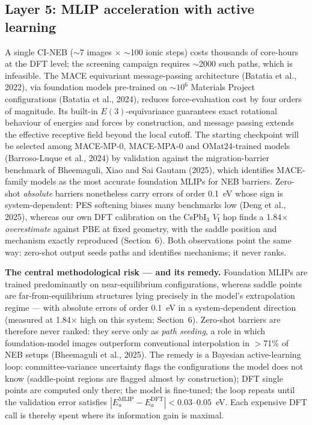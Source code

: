 \documentclass[11pt,a4paper]{article}
\begin{document}
\subsection{Layer 5: MLIP acceleration with active learning}
A single CI-NEB ($\sim$7 images $\times$ $\sim$100 ionic steps) costs thousands of
core-hours at the DFT level; the screening campaign requires $\sim$2000 such paths,
which is infeasible. The MACE equivariant message-passing architecture (Batatia et
al., 2022), via foundation models pre-trained on $\sim$$10^6$ Materials Project
configurations (Batatia et al., 2024), reduces force-evaluation cost by four orders of
magnitude. Its built-in $E(3)$-equivariance guarantees exact rotational behaviour of
energies and forces by construction, and message passing extends the effective
receptive field beyond the local cutoff. The starting checkpoint will be selected among
MACE-MP-0, MACE-MPA-0 and OMat24-trained models (Barroso-Luque et al., 2024) by
validation against the migration-barrier benchmark of Bheemaguli, Xiao and Sai Gautam
(2025), which identifies MACE-family models as the most accurate foundation MLIPs for
NEB barriers. Zero-shot \emph{absolute} barriers nonetheless carry errors of order
0.1~eV whose sign is system-dependent: PES softening biases many benchmarks low (Deng
et al., 2025), whereas our own DFT calibration on the CsPbI$_3$ $V_{\mathrm{I}}$ hop
finds a 1.84$\times$ \emph{overestimate} against PBE at fixed geometry, with the
saddle position and mechanism exactly reproduced (Section~6). Both observations point
the same way: zero-shot output seeds paths and identifies mechanisms; it never ranks.

\begin{riskbox}
\textbf{The central methodological risk --- and its remedy.} Foundation MLIPs are
trained predominantly on near-equilibrium configurations, whereas saddle points are
far-from-equilibrium structures lying precisely in the model's extrapolation regime ---
with absolute errors of order 0.1~eV in a system-dependent direction (measured at
1.84$\times$ high on this system; Section~6).
Zero-shot barriers are therefore never ranked: they serve only as \emph{path seeding},
a role in which foundation-model images outperform conventional interpolation in
$>$71\% of NEB setups (Bheemaguli et al., 2025). The remedy is a Bayesian
active-learning loop: committee-variance uncertainty flags the configurations the model
does not know (saddle-point regions are flagged almost by construction); DFT single
points are computed only there; the model is fine-tuned; the loop repeats until the
validation error satisfies
$|E_a^{\mathrm{MLIP}} - E_a^{\mathrm{DFT}}| < 0.03$--$0.05$~eV. Each expensive DFT call
is thereby spent where its information gain is maximal.
\end{riskbox}
\end{document}
